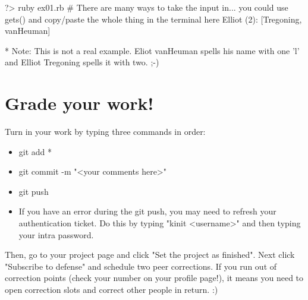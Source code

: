 \documentclass{42-en}
\begin{document}
\begin{42console}
	?> ruby ex01.rb
	# There are many ways to take the input in... you could use gets() and copy/paste the whole thing in the terminal here
	Elliot (2): [Tregoning, vanHeuman]
\end{42console}

* Note: This is not a real example. Eliot vanHeuman spells his name with one 'l' and Elliot Tregoning spells it with two. ;-)



\chapter{Grade your work!}

Turn in your work by typing three commands in order: 
\begin{itemize}
	\item git add *
	\item git commit -m "<your comments here>"
	\item git push
	\item If you have an error during the git push, you may need to refresh your authentication ticket. Do this by typing "kinit <username>" and then typing your intra password.
\end{itemize}

Then, go to your project page and click "Set the project as finished".
Next click "Subscribe to defense" and schedule two peer corrections.
If you run out of correction points (check your number on your profile page!), it means you need to open correction slots and correct other people in return. :)
\end{document}
